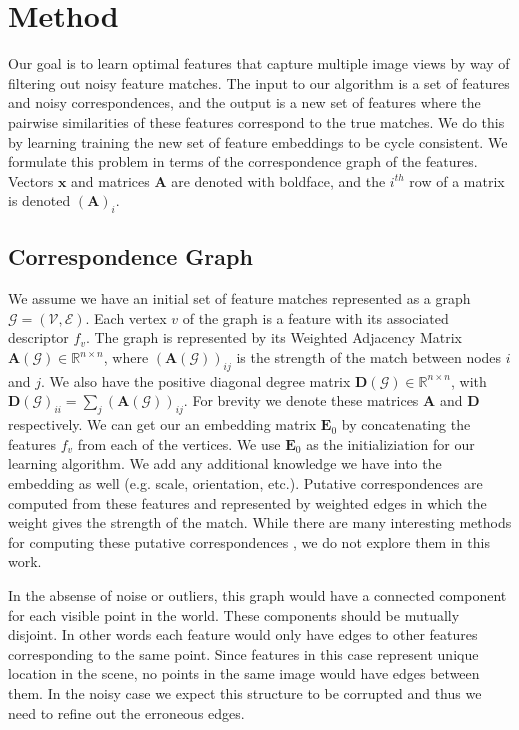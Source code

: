 \documentclass[10pt,twocolumn,letterpaper]{article}
\newcommand{\bR}{\mathbb{R}}
\newcommand{\mat}[1]{\mathbf{#1}}
\begin{document}
\section{Method}
Our goal is to learn optimal features that capture multiple image views by way of filtering out noisy feature matches.
The input to our algorithm is a set of features and noisy correspondences, and the output is a new set of features where the pairwise similarities of these features correspond to the true matches.
We do this by learning training the new set of feature embeddings to be cycle consistent.
We formulate this problem in terms of the correspondence graph of the features.
Vectors $\mat{x}$ and matrices $\mat{A}$ are denoted with boldface, and the $i^{th}$ row of a matrix is denoted $(\mat{A})_i$.
\subsection{Correspondence Graph}
We assume we have an initial set of feature matches represented as a graph $\mathcal{G} = (\mathcal{V}, \mathcal{E})$.
Each vertex $v$ of the graph is a feature with its associated descriptor $f_v$. 
The graph is represented by its Weighted Adjacency Matrix $\mat{A}(\mathcal{G}) \in \bR^{n \times n}$, where $(\mat{A}(\mathcal{G}))_{ij}$ is the strength of the match between nodes $i$ and $j$. We also have the positive diagonal degree matrix $\mat{D}(\mathcal{G}) \in \bR^{n \times n}$, with $\mat{D}(\mathcal{G})_{ii} = \sum_j (\mat{A}(\mathcal{G}))_{ij}$. For brevity we denote these matrices $\mat{A}$ and $\mat{D}$ respectively.
We can get our an embedding matrix $\mat{E}_0$ by concatenating the features $f_v$ from each of the vertices.
We use $\mat{E}_0$ as the initializiation for our learning algorithm.
We add any additional knowledge we have into the embedding as well (e.g. scale, orientation, etc.).
Putative correspondences are computed from these features and represented by weighted edges in which the weight gives the strength of the match.
While there are many interesting methods for computing these putative correspondences \cite{suh2015subgraph, yi2018learning}, we do not explore them in this work.

In the absense of noise or outliers, this graph would have a connected component for each visible point in the world.
These components should be mutually disjoint. 
In other words each feature would only have edges to other features corresponding to the same point.
Since features in this case represent unique location in the scene, no points in the same image would have edges between them.
In the noisy case we expect this structure to be corrupted and thus we need to refine out the erroneous edges.
\end{document}
